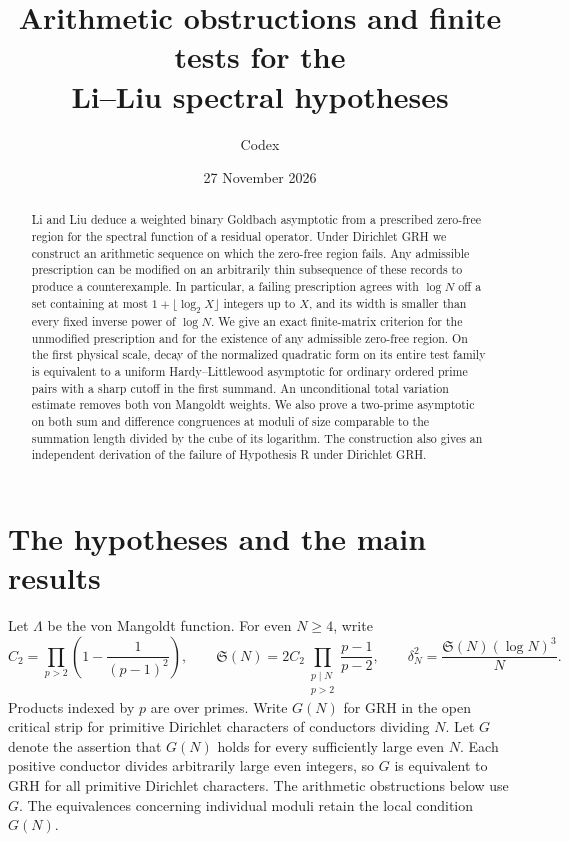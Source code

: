 \documentclass[11pt,a4paper]{article}
\title{Arithmetic obstructions and finite tests for the\\ Li--Liu spectral hypotheses}
\author{Codex}
\date{27 November 2026}
\newcommand{\SSg}{\mathfrak S}
\begin{document}
\maketitle
\begin{abstract}
Li and Liu deduce a weighted binary Goldbach asymptotic from a prescribed zero-free region for the spectral function of a residual operator. Under Dirichlet GRH we construct an arithmetic sequence on which the zero-free region fails. Any admissible prescription can be modified on an arbitrarily thin subsequence of these records to produce a counterexample. In particular, a failing prescription agrees with $\log N$ off a set containing at most $1+\lfloor\log_2 X\rfloor$ integers up to $X$, and its width is smaller than every fixed inverse power of $\log N$. We give an exact finite-matrix criterion for the unmodified prescription and for the existence of any admissible zero-free region. On the first physical scale, decay of the normalized quadratic form on its entire test family is equivalent to a uniform Hardy--Littlewood asymptotic for ordinary ordered prime pairs with a sharp cutoff in the first summand. An unconditional total variation estimate removes both von Mangoldt weights. We also prove a two-prime asymptotic on both sum and difference congruences at moduli of size comparable to the summation length divided by the cube of its logarithm. The construction also gives an independent derivation of the failure of Hypothesis R under Dirichlet GRH.
\end{abstract}

\section{The hypotheses and the main results}

Let $\Lambda$ be the von Mangoldt function. For even $N\ge4$, write
\[
 C_2=\prod_{p>2}\left(1-\frac{1}{(p-1)^2}\right),\qquad
 \SSg(N)=2C_2\prod_{\substack{p\mid N\\p>2}}\frac{p-1}{p-2},
 \qquad \delta_N^2=\frac{\SSg(N)(\log N)^3}{N}.
\]
Products indexed by $p$ are over primes. Write $G(N)$ for GRH in the open critical strip for primitive Dirichlet characters of conductors dividing $N$. Let $G$ denote the assertion that $G(N)$ holds for every sufficiently large even $N$. Each positive conductor divides arbitrarily large even integers, so $G$ is equivalent to GRH for all primitive Dirichlet characters. The arithmetic obstructions below use $G$. The equivalences concerning individual moduli retain the local condition $G(N)$.
\end{document}
